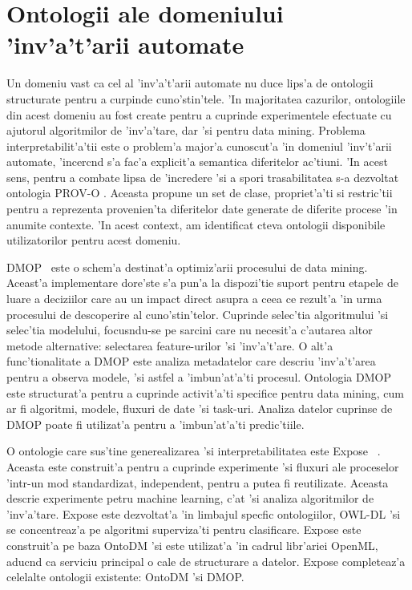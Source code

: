 \documentclass[12pt,a4paper,twoside]{report}
\begin{document}
\section{Ontologii ale domeniului 'inv'a't'arii automate}

Un domeniu vast ca cel al 'inv'a't'arii automate nu duce lips'a de ontologii structurate pentru a curpinde cuno'stin'tele. 'In majoritatea cazurilor, ontologiile din acest domeniu au fost create pentru a cuprinde experimentele efectuate cu ajutorul algoritmilor de 'inv'a'tare, dar 'si pentru data mining. Problema interpretabilit'a'tii este o problem'a major'a cunoscut'a 'in domeniul 'inv't'arii automate, 'incerc\ia nd s'a fac'a explicit'a semantica diferitelor ac'tiuni. 'In acest sens, pentru a combate lipsa de 'incredere 'si a spori trasabilitatea s-a dezvoltat ontologia PROV-O \cite{provo}. Aceasta propune un set de clase, propriet'a'ti si restric'tii pentru a reprezenta provenien'ta diferitelor date generate de diferite procese 'in anumite contexte. 'In acest context, am identificat c\ia teva ontologii disponibile utilizatorilor pentru acest domeniu.


 
 DMOP~\cite{KeetTheOntology} este o schem'a destinat'a optimiz'arii procesului de data mining. Aceast'a implementare dore'ste s'a pun'a la dispozi'tie suport pentru etapele de luare a deciziilor care au un impact direct asupra a ceea ce rezult'a 'in urma procesului de descoperire al cuno'stin'telor. Cuprinde selec'tia algoritmului 'si selec'tia modelului, focus\ia ndu-se pe sarcini care nu necesit'a c'autarea altor metode alternative: selectarea feature-urilor 'si 'inv'a't'are. O alt'a func'tionalitate a DMOP este analiza metadatelor care descriu 'inv'a't'area pentru a observa modele, 'si astfel a 'imbun'at'a'ti procesul. Ontologia DMOP este structurat'a pentru a cuprinde activit'a'ti specifice pentru data mining, cum ar fi algoritmi, modele, fluxuri de date 'si task-uri. Analiza datelor cuprinse de DMOP poate fi utilizat'a pentru a 'imbun'at'a'ti predic'tiile.
 
 
 O ontologie care sus'tine generealizarea 'si interpretabilitatea este Expose ~\cite{PDFExperiments}. Aceasta este construit'a pentru a cuprinde experimente 'si fluxuri ale proceselor 'intr-un mod standardizat, independent, pentru a putea fi reutilizate. Aceasta descrie experimente petru machine learning, c'at 'si analiza algoritmilor de 'inv'a'tare. Expose este dezvoltat'a 'in limbajul specfic ontologiilor, OWL-DL 'si se concentreaz'a pe algoritmi superviza'ti pentru clasificare. Expose este construit'a pe baza OntoDM 'si este utilizat'a 'in cadrul libr'ariei OpenML, aduc\ia nd ca serviciu principal o cale de structurare a datelor. Expose completeaz'a celelalte ontologii existente: OntoDM 'si DMOP.
\end{document}
